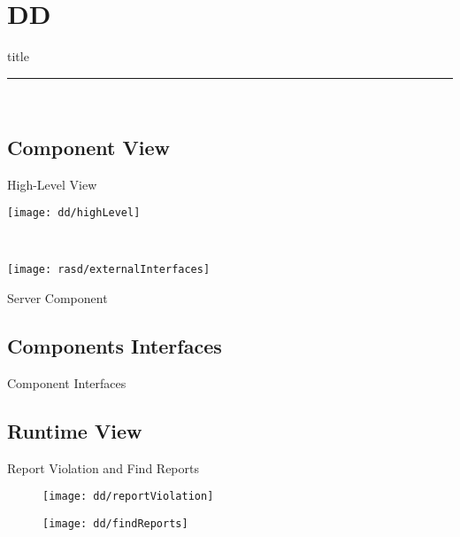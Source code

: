 \section{DD}

	\begin{frame}[plain]
		\vfill
		\centering
		\begin{beamercolorbox}[sep=8pt,center,shadow=true,rounded=true]{title}
			\textbf{\insertsectionhead}\par%
			\color{polimiblue}\noindent\rule{10cm}{1pt} \\
		\end{beamercolorbox}
		\vfill
	\end{frame}

	\subsection{Component View}
		\begin{frame}{High-Level View}
			
			\begin{minipage}{0.4\textwidth}
				\centering
				\texttt{[image: dd/highLevel]}	
			\end{minipage}\hspace{2.5cm}
			~
			\begin{minipage}{0.2\textwidth}
				\vspace{-6cm}
				\centering
				\texttt{[image: rasd/externalInterfaces]}
			\end{minipage}
			
		\end{frame}
	

	
		\begin{frame}{Server Component}
			\noindent{}
		\end{frame}
	
	\subsection{Components Interfaces}
		\begin{frame}{Component Interfaces}
			\vspace{-6pt}
			\noindent{}
		\end{frame}
	
	\subsection{Runtime View}
		\begin{frame}{Report Violation and Find Reports}
			\vspace{-5pt}
			\begin{figure}
				\centering
				\texttt{[image: dd/reportViolation]}
			\end{figure}
			\vspace{-10pt}
			\begin{figure}
				\centering
				\texttt{[image: dd/findReports]}
			\end{figure}
		\end{frame}
	
